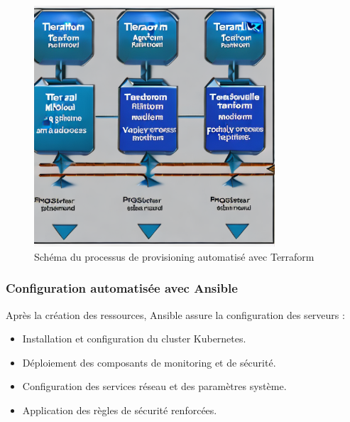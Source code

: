 \begin{figure}[H]
	\centering
	\includegraphics[width=0.8\textwidth]{figures/terraform-provisioning.png}
	\caption{Schéma du processus de provisioning automatisé avec Terraform}
\end{figure}

\subsubsection*{Configuration automatisée avec Ansible}

Après la création des ressources, Ansible assure la configuration des serveurs :
\begin{itemize}
	\item Installation et configuration du cluster Kubernetes.
	\item Déploiement des composants de monitoring et de sécurité.
	\item Configuration des services réseau et des paramètres système.
	\item Application des règles de sécurité renforcées.
\end{itemize}

